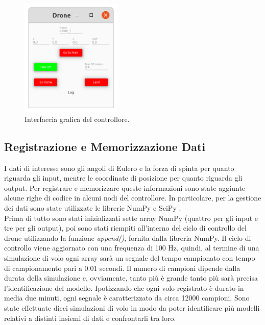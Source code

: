 \begin{figure}[H]
	\centering
	\includegraphics[width=0.43\textwidth]{gfx/ROS/drone_controller}
	\caption[Interfaccia grafica del controllore.]{Interfaccia grafica del controllore.}
	\label{fig:drone_controller}
\end{figure}

\subsection{Registrazione e Memorizzazione Dati}
I dati di interesse sono gli angoli di Eulero e la forza di spinta per quanto riguarda gli input, mentre le coordinate di posizione per quanto riguarda gli output. Per registrare e memorizzare queste informazioni sono state aggiunte alcune righe di codice in alcuni nodi del controllore. In particolare, per la gestione dei dati sono state utilizzate le librerie NumPy \cite{numPy} e SciPy \cite{sciPy}.\\

Prima di tutto sono stati inizializzati sette array NumPy (quattro per gli input e tre per gli output), poi sono stati riempiti all'interno del ciclo di controllo del drone utilizzando la funzione \emph{append()}, fornita dalla libreria NumPy. Il ciclo di controllo viene aggiornato con una frequenza di 100 Hz, quindi, al termine di una simulazione di volo ogni array sarà un segnale del tempo campionato con tempo di campionamento pari a 0.01 secondi. Il numero di campioni dipende dalla durata della simulazione e, ovviamente, tanto più è grande tanto più sarà precisa l'identificazione del modello. Ipotizzando che ogni volo registrato è durato in media due minuti, ogni segnale è caratterizzato da circa 12000 campioni. Sono state effettuate dieci simulazioni di volo in modo da poter identificare più modelli relativi a distinti insiemi di dati e confrontarli tra loro.\\

